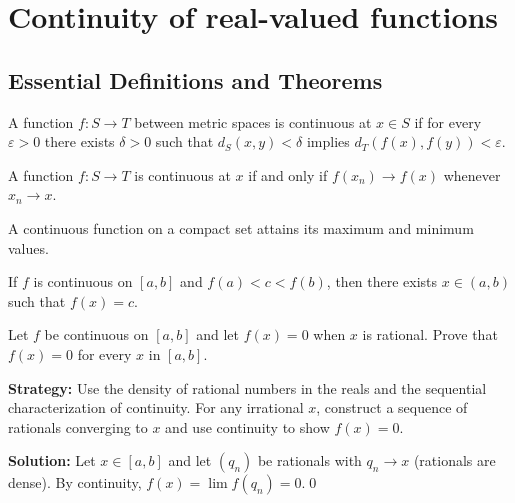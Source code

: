 \section{Continuity of real-valued functions}

\subsection*{Essential Definitions and Theorems}

\begin{definition}
A function $f: S \to T$ between metric spaces is continuous at $x \in S$ if for every $\varepsilon > 0$ there exists $\delta > 0$ such that $d_S(x,y) < \delta$ implies $d_T(f(x), f(y)) < \varepsilon$.
\end{definition}

\begin{theorem}
A function $f: S \to T$ is continuous at $x$ if and only if $f(x_n) \to f(x)$ whenever $x_n \to x$.
\end{theorem}

\begin{theorem}
A continuous function on a compact set attains its maximum and minimum values.
\end{theorem}

\begin{theorem}
If $f$ is continuous on $[a,b]$ and $f(a) < c < f(b)$, then there exists $x \in (a,b)$ such that $f(x) = c$.
\end{theorem}



\begin{problembox}
Let \( f \) be continuous on \([a, b]\) and let \( f(x) = 0 \) when \( x \) is rational. Prove that \( f(x) = 0 \) for every \( x \) in \([a, b]\).
\end{problembox}

\noindent\textbf{Strategy:} Use the density of rational numbers in the reals and the sequential characterization of continuity. For any irrational $x$, construct a sequence of rationals converging to $x$ and use continuity to show $f(x) = 0$.

\bigskip\noindent\textbf{Solution:}
Let $x\in[a,b]$ and let $(q_n)$ be rationals with $q_n\to x$ (rationals are dense). By continuity, $f(x)=\lim f(q_n)=0$.\qed



